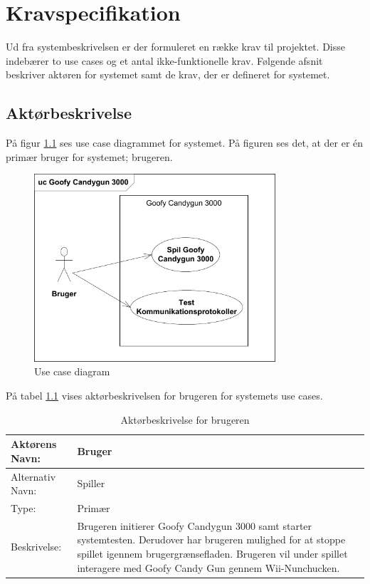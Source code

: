 \chapter{Kravspecifikation}
Ud fra systembeskrivelsen er der formuleret en række krav til projektet. Disse indebærer to use cases og et antal ikke-funktionelle krav. Følgende afsnit beskriver aktøren for systemet samt de krav, der er defineret for systemet.

\section{Aktørbeskrivelse}
På figur \ref{fig:useCaseDiagram} ses use case diagrammet for systemet. På figuren ses det, at der er én primær bruger for systemet; brugeren. 

\begin{figure}[H]
	\centering
	\includegraphics[width=0.80\textwidth]{Kravsspecifikation/images/usecaseDiagram}
	\caption{Use case diagram}
	\label{fig:useCaseDiagram}
\end{figure}

\noindent På tabel \ref{table:actor} vises aktørbeskrivelsen for brugeren for systemets use cases. 
\begin{table}[H]
	\begin{tabularx}{\textwidth}{| p{2cm} | p{9.1cm} |}
		\hline
		Aktørens Navn: & Bruger \\ 
		\hline
		Alternativ Navn: & Spiller \\
		\hline
		Type: & Primær \\
		\hline
		Beskrivelse: & Brugeren initierer Goofy Candygun 3000 samt starter systemtesten. Derudover har brugeren mulighed for at stoppe spillet igennem brugergrænsefladen. Brugeren vil under spillet interagere med Goofy Candy Gun gennem Wii-Nunchucken.
		\\ \hline
	\end{tabularx}
	\caption{Aktørbeskrivelse for brugeren}
	\label{table:actor}
\end{table}

